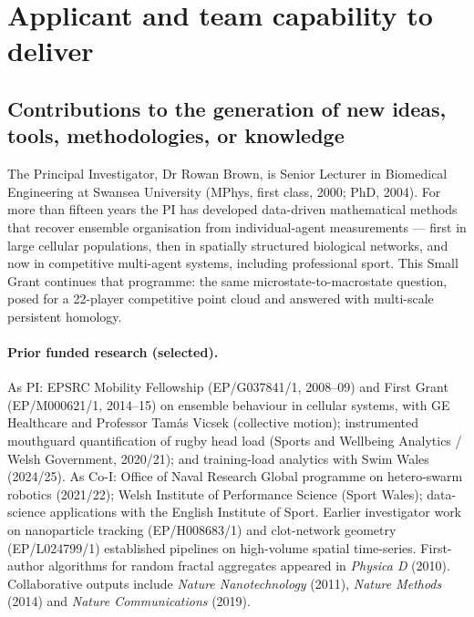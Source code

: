 \section{Applicant and team capability to deliver}

\subsection{Contributions to the generation of new ideas, tools, methodologies, or knowledge}

The Principal Investigator, Dr Rowan Brown, is Senior Lecturer in Biomedical Engineering at Swansea University (MPhys, first class, 2000; PhD, 2004). For more than fifteen years the PI has developed data-driven mathematical methods that recover ensemble organisation from individual-agent measurements --- first in large cellular populations, then in spatially structured biological networks, and now in competitive multi-agent systems, including professional sport. This Small Grant continues that programme: the same microstate-to-macrostate question, posed for a 22-player competitive point cloud and answered with multi-scale persistent homology.

\paragraph{Prior funded research (selected).}
As PI: EPSRC Mobility Fellowship (EP/G037841/1, 2008--09) and First Grant (EP/M000621/1, 2014--15) on ensemble behaviour in cellular systems, with GE Healthcare and Professor Tam\'as Vicsek (collective motion); instrumented mouthguard quantification of rugby head load (Sports and Wellbeing Analytics / Welsh Government, 2020/21); and training-load analytics with Swim Wales (2024/25). As Co-I: Office of Naval Research Global programme on hetero-swarm robotics (2021/22); Welsh Institute of Performance Science (Sport Wales); data-science applications with the English Institute of Sport. Earlier investigator work on nanoparticle tracking (EP/H008683/1) and clot-network geometry (EP/L024799/1) established pipelines on high-volume spatial time-series. First-author algorithms for random fractal aggregates appeared in \emph{Physica D} (2010). Collaborative outputs include \emph{Nature Nanotechnology} (2011), \emph{Nature Methods} (2014) and \emph{Nature Communications} (2019).

